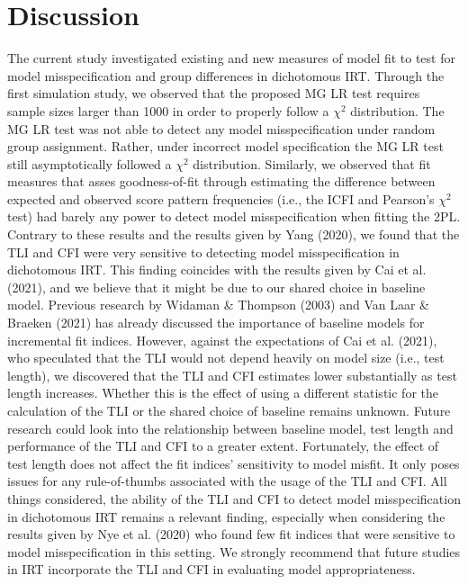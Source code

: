 \documentclass[Royal,sageapa,times,doublespace]{sagej}
\begin{document}
\section{\centering Discussion}

The current study investigated existing and new measures of model fit to test for model misspecification and group differences in dichotomous IRT. Through the first simulation study, we observed that the proposed MG LR test requires sample sizes larger than 1000 in order to properly follow a $\chi^2$ distribution. The MG LR test was not able to detect any model misspecification under random group assignment. Rather, under incorrect model specification the MG LR test still asymptotically followed a $\chi^2$ distribution. Similarly, we observed that fit measures that asses goodness-of-fit through estimating the difference between expected and observed score pattern frequencies (i.e., the ICFI and Pearson's $\chi^2$ test) had barely any power to detect model misspecification when fitting the 2PL. \\
\indent Contrary to these results and the results given by Yang (2020), we found that the TLI and CFI were very sensitive to detecting model misspecification in dichotomous IRT. This finding coincides with the results given by Cai et al. (2021), and we believe that it might be due to our shared choice in baseline model. Previous research by Widaman \& Thompson (2003) and Van Laar \& Braeken (2021) has already discussed the importance of baseline models for incremental fit indices. However, against the expectations of Cai et al. (2021), who speculated that the TLI would not depend heavily on model size (i.e., test length), we discovered that the TLI and CFI estimates lower substantially as test length increases. Whether this is the effect of using a different statistic for the calculation of the TLI or the shared choice of baseline remains unknown. Future research could look into the relationship between baseline model, test length and performance of the TLI and CFI to a greater extent. Fortunately, the effect of test length does not affect the fit indices' sensitivity to model misfit. It only poses issues for any rule-of-thumbs associated with the usage of the TLI and CFI. All things considered, the ability of the TLI and CFI to detect model misspecification in dichotomous IRT remains a relevant finding, especially when considering the results given by Nye et al. (2020) who found few fit indices that were sensitive to model misspecification in this setting. We strongly recommend that future studies in IRT incorporate the TLI and CFI in evaluating model appropriateness. \\
\end{document}
